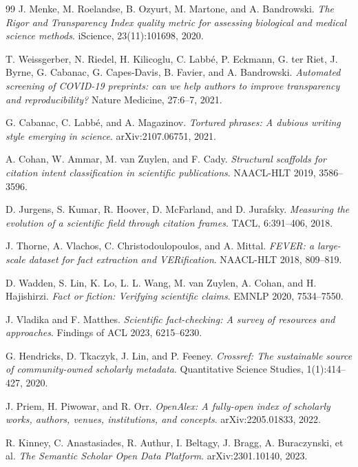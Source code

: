 \documentclass{article}
\begin{document}
{\begin{thebibliography}{99}
J. Menke, M. Roelandse, B. Ozyurt, M. Martone, and A. Bandrowski.
\textit{The Rigor and Transparency Index quality metric for assessing biological and medical science methods}.
iScience, 23(11):101698, 2020.

T. Weissgerber, N. Riedel, H. Kilicoglu, C. Labb\'{e}, P. Eckmann, G. ter Riet, J. Byrne, G. Cabanac, G. Capes-Davis, B. Favier, and A. Bandrowski.
\textit{Automated screening of COVID-19 preprints: can we help authors to improve transparency and reproducibility?}
Nature Medicine, 27:6--7, 2021.

G. Cabanac, C. Labb\'{e}, and A. Magazinov.
\textit{Tortured phrases: A dubious writing style emerging in science}.
arXiv:2107.06751, 2021.

A. Cohan, W. Ammar, M. van Zuylen, and F. Cady.
\textit{Structural scaffolds for citation intent classification in scientific publications}.
NAACL-HLT 2019, 3586--3596.

D. Jurgens, S. Kumar, R. Hoover, D. McFarland, and D. Jurafsky.
\textit{Measuring the evolution of a scientific field through citation frames}.
TACL, 6:391--406, 2018.

J. Thorne, A. Vlachos, C. Christodoulopoulos, and A. Mittal.
\textit{FEVER: a large-scale dataset for fact extraction and VERification}.
NAACL-HLT 2018, 809--819.

D. Wadden, S. Lin, K. Lo, L. L. Wang, M. van Zuylen, A. Cohan, and H. Hajishirzi.
\textit{Fact or fiction: Verifying scientific claims}.
EMNLP 2020, 7534--7550.

J. Vladika and F. Matthes.
\textit{Scientific fact-checking: A survey of resources and approaches}.
Findings of ACL 2023, 6215--6230.

G. Hendricks, D. Tkaczyk, J. Lin, and P. Feeney.
\textit{Crossref: The sustainable source of community-owned scholarly metadata}.
Quantitative Science Studies, 1(1):414--427, 2020.

J. Priem, H. Piwowar, and R. Orr.
\textit{OpenAlex: A fully-open index of scholarly works, authors, venues, institutions, and concepts}.
arXiv:2205.01833, 2022.

R. Kinney, C. Anastasiades, R. Authur, I. Beltagy, J. Bragg, A. Buraczynski, et al.
\textit{The Semantic Scholar Open Data Platform}.
arXiv:2301.10140, 2023.


\end{thebibliography}}
\end{document}

